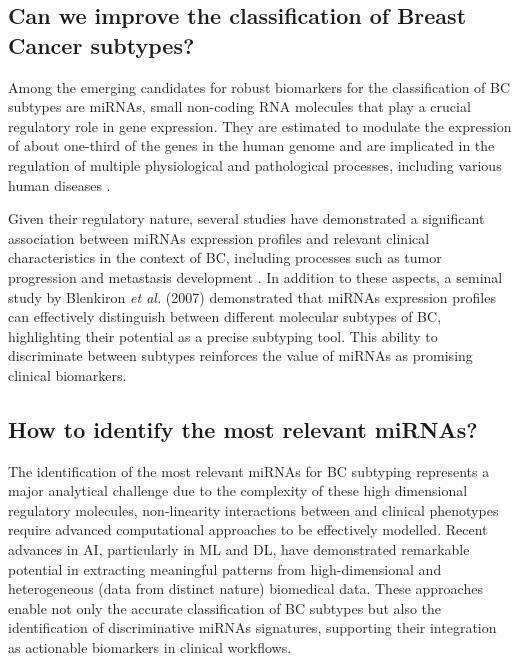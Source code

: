 \subsection{Can we improve the classification of Breast Cancer subtypes?}
Among the emerging candidates for robust biomarkers for the classification of
\gls{BC} subtypes are \gls{miRNAs}, small non-coding RNA molecules that play a
crucial regulatory role in gene expression. They are estimated to modulate the
expression of about one-third of the genes in the human genome
\textcite{mirna_importance_Hammond2015An} and are implicated in the regulation
of multiple physiological and pathological processes, including various human
diseases \textcite{mirna_as_biomarkers_Ho2022}.

Given their regulatory nature, several studies have demonstrated a significant
association between \gls{miRNAs} expression profiles and relevant clinical
characteristics in the context of \gls{BC}, including processes such as tumor
progression and metastasis development \textcite{mirna_as_biomarkers_Ho2022}
\textcite{mirnas_in_bc_Muñoz2023}
\textcite{mirna_as_bio_for_sub_Blenkiron2007MicroRNA}. In addition to these
aspects, a seminal study by Blenkiron \textit{et al.} (2007) demonstrated that
\gls{miRNAs} expression profiles can effectively distinguish between different
molecular subtypes of \gls{BC}, highlighting their potential as a precise
subtyping tool. This ability to discriminate between subtypes reinforces the
value of \gls{miRNAs} as promising clinical biomarkers.

\subsection{How to identify the most relevant miRNAs?}

The identification of the most relevant \gls{miRNAs} for \gls{BC} subtyping
represents a major analytical challenge due to the complexity of these high
dimensional regulatory molecules, non-linearity interactions between and
clinical phenotypes require advanced computational approaches to be effectively
modelled. Recent advances in \gls{AI}, particularly in \gls{ML} and \gls{DL},
have demonstrated remarkable potential in extracting meaningful patterns from
high-dimensional and heterogeneous (data from distinct nature) biomedical data.
These approaches enable not only the accurate classification of \gls{BC}
subtypes but also the identification of discriminative \gls{miRNAs} signatures,
supporting their integration as actionable biomarkers in clinical workflows.

